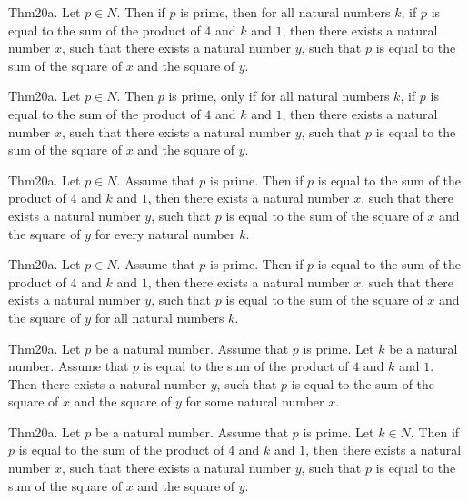 \documentclass{article}
\begin{document}
Thm20a. Let $p \in N$. Then if $p$ is prime, then for all natural numbers $k$, if $p$ is equal to the sum of the product of $4$ and $k$ and $1$, then there exists a natural number $x$, such that there exists a natural number $y$, such that $p$ is equal to the sum of the square of $x$ and the square of $y$.

Thm20a. Let $p \in N$. Then $p$ is prime, only if for all natural numbers $k$, if $p$ is equal to the sum of the product of $4$ and $k$ and $1$, then there exists a natural number $x$, such that there exists a natural number $y$, such that $p$ is equal to the sum of the square of $x$ and the square of $y$.

Thm20a. Let $p \in N$. Assume that $p$ is prime. Then if $p$ is equal to the sum of the product of $4$ and $k$ and $1$, then there exists a natural number $x$, such that there exists a natural number $y$, such that $p$ is equal to the sum of the square of $x$ and the square of $y$ for every natural number $k$.

Thm20a. Let $p \in N$. Assume that $p$ is prime. Then if $p$ is equal to the sum of the product of $4$ and $k$ and $1$, then there exists a natural number $x$, such that there exists a natural number $y$, such that $p$ is equal to the sum of the square of $x$ and the square of $y$ for all natural numbers $k$.

Thm20a. Let $p$ be a natural number. Assume that $p$ is prime. Let $k$ be a natural number. Assume that $p$ is equal to the sum of the product of $4$ and $k$ and $1$. Then there exists a natural number $y$, such that $p$ is equal to the sum of the square of $x$ and the square of $y$ for some natural number $x$.

Thm20a. Let $p$ be a natural number. Assume that $p$ is prime. Let $k \in N$. Then if $p$ is equal to the sum of the product of $4$ and $k$ and $1$, then there exists a natural number $x$, such that there exists a natural number $y$, such that $p$ is equal to the sum of the square of $x$ and the square of $y$.
\end{document}
